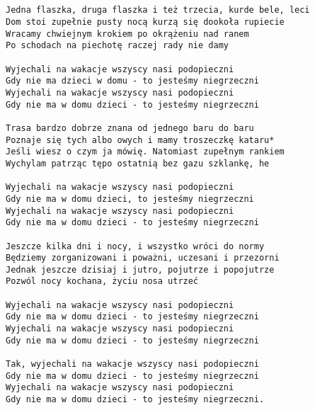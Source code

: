 \documentclass[12pt]{article}
\begin{document}
\subsection*{}
\begin{verbatim}
Jedna flaszka, druga flaszka i też trzecia, kurde bele, leci
Dom stoi zupełnie pusty nocą kurzą się dookoła rupiecie
Wracamy chwiejnym krokiem po okrążeniu nad ranem
Po schodach na piechotę raczej rady nie damy

Wyjechali na wakacje wszyscy nasi podopieczni
Gdy nie ma dzieci w domu - to jesteśmy niegrzeczni
Wyjechali na wakacje wszyscy nasi podopieczni
Gdy nie ma w domu dzieci - to jesteśmy niegrzeczni

Trasa bardzo dobrze znana od jednego baru do baru
Poznaje się tych albo owych i mamy troszeczkę kataru*
Jeśli wiesz o czym ja mówię. Natomiast zupełnym rankiem
Wychylam patrząc tępo ostatnią bez gazu szklankę, he

Wyjechali na wakacje wszyscy nasi podopieczni
Gdy nie ma w domu dzieci, to jesteśmy niegrzeczni
Wyjechali na wakacje wszyscy nasi podopieczni
Gdy nie ma w domu dzieci - to jesteśmy niegrzeczni

Jeszcze kilka dni i nocy, i wszystko wróci do normy
Będziemy zorganizowani i poważni, uczesani i przezorni
Jednak jeszcze dzisiaj i jutro, pojutrze i popojutrze
Pozwól nocy kochana, życiu nosa utrzeć

Wyjechali na wakacje wszyscy nasi podopieczni
Gdy nie ma w domu dzieci - to jesteśmy niegrzeczni
Wyjechali na wakacje wszyscy nasi podopieczni
Gdy nie ma w domu dzieci - to jesteśmy niegrzeczni

Tak, wyjechali na wakacje wszyscy nasi podopieczni
Gdy nie ma w domu dzieci - to jesteśmy niegrzeczni
Wyjechali na wakacje wszyscy nasi podopieczni
Gdy nie ma w domu dzieci - to jesteśmy niegrzeczni.
\end{verbatim}
\clearpage
\end{document}
